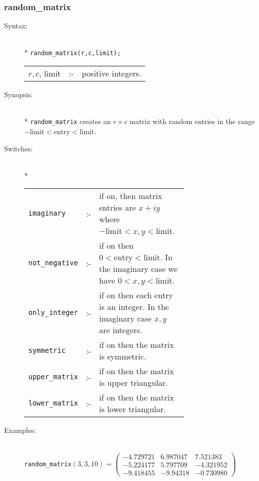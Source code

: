 \subsubsection{random\_matrix}
\label{linalg:random_matrix}

\begin{description}
\item[Syntax:]\mbox{}\\*
\texttt{random\_matrix(r,c,limit);}\\[2mm]
\begin{tabular}{l l l}
$r,c$, limit &:-& positive integers. \\
\end{tabular}

\item[Synopsis:]\mbox{}\\*
\texttt{random\_matrix} creates an $r\times c$ matrix with random entries in the
range $-\text{limit} < \text{entry} < \text{limit}$.

\hypertarget{switch:IMAGINARY}{}
\hypertarget{switch:NOT_NEGATIVE}{}
\hypertarget{switch:ONLY_INTEGER}{}
\hypertarget{switch:SYMMETRIC}{}
\hypertarget{switch:LOWER_MATRIX}{}
\hypertarget{switch:UPPER_MATRIX}{}
\item[Switches:]\mbox{}\\*
\begin{tabular}{l l p{0.685\linewidth}}
\texttt{imaginary}  &:-& if
on, then matrix entries are $x+iy$ where $-\text{limit} < x,y < \text{limit}$.\\
\texttt{not\_negative} &:-& if on then $0 <
\text{entry} < \text{limit}$. In the imaginary case we have $0<x,y<\text{limit}$.\\
\texttt{only\_integer} &:-& if on then each
entry is an integer. In the imaginary case $x,y$ are integers.\\
\texttt{symmetric} &:-& if on then the matrix is symmetric. \\
\texttt{upper\_matrix} &:-& if on then the
matrix is upper triangular. \\
\texttt{lower\_matrix} &:-& if on then the matrix is lower triangular.
\end{tabular}

\item[Examples:]\mbox{}\\
  \texttt{random\_matrix}\((3,3,10) =
  \begin{pmatrix} -4.729721 & 6.987047 & 7.521383 \\
    - 5.224177 & 5.797709 & - 4.321952 \\
    - 9.418455 & - 9.94318 & - 0.730980
  \end{pmatrix}\)


\end{description}
